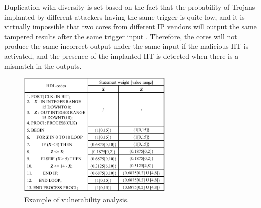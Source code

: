 \documentclass[10pt,journal, compsoc]{IEEEtran}
\begin{document}
Duplication-with-diversity is set based on the fact that the probability of Trojans implanted by different attackers having the same trigger is quite low, and it is virtually impossible that two cores from different IP vendors will output the same tampered results after the same trigger input \cite{article:NV}. Therefore, the cores will not produce the same incorrect output under the same input if the malicious HT is activated, and the presence of the implanted HT is detected when there is a mismatch in the outputs.

\begin{figure}[!t]
\centering
\includegraphics[width=7.4cm]{figure/sample_code_analysis.pdf}
\caption{Example of vulnerability analysis.}
\label{fig:sample_code_analysis}
\end{figure}
\end{document}
